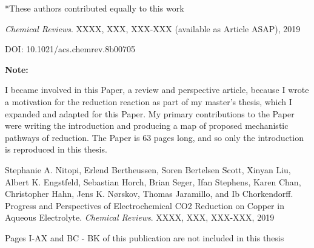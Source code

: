 		*These authors contributed equally to this work
		
		\textit{Chemical Reviews}. XXXX, XXX, XXX-XXX (available as Article ASAP), 2019
		
		DOI: 10.1021/acs.chemrev.8b00705
		
		\vspace{2cm}
		
		\textbf{Note:}
		
		I became involved in this Paper, a review and perspective article, because I wrote a motivation for the  reduction reaction as part of my master's thesis, which I expanded and adapted for this Paper. My primary contributions to the Paper were writing the introduction and producing a map of proposed mechanistic pathways of  reduction. The Paper is 63 pages long, and so only the introduction is reproduced in this thesis.	
		
		
		
		\clearpage
		\vspace{5cm}
		
		
		{
			\hspace{0pt}
			\vfill
			Stephanie A. Nitopi, Erlend Bertheussen, Soren Bertelsen Scott, Xinyan Liu, Albert K. Engstfeld, Sebastian Horch, Brian Seger, Ifan Stephens, Karen Chan, Christopher Hahn, Jens K. Nørskov, Thomas Jaramillo, and Ib Chorkendorff. Progress and Perspectives of Electrochemical CO2 Reduction on Copper in Aqueous Electrolyte. \textit{Chemical Reviews}. XXXX, XXX, XXX-XXX, 2019
			
			\vspace{1cm}
			
			\centering\Large
			Pages I-AX and BC - BK of this publication are not included in this thesis
			\vfill
			\hspace{0pt}
		}
		\clearpage
		
		
		
		

